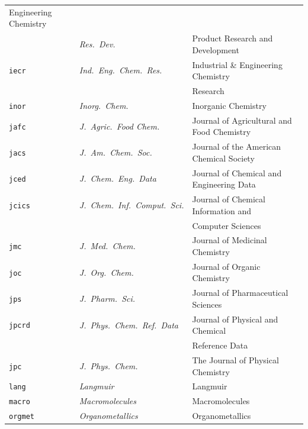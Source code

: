\documentclass{article}
\begin{document}
\begin{tabular}{|lll|}
Engineering Chemistry \\ 
& \hfill\textit{Res.\ Dev.} & \hfill Product Research and Development \\ 
\texttt{iecr} & \textit{Ind.\ Eng.\ Chem.\ Res.} & Industrial \&{}
Engineering Chemistry \\ 
&  & \hfill Research \\ 
\texttt{inor} & \textit{Inorg.\ Chem.} & Inorganic Chemistry \\ 
\texttt{jafc} & \textit{J.~Agric.\ Food Chem.} & Journal of Agricultural and
Food Chemistry \\ 
\texttt{jacs} & \textit{J.~Am.\ Chem.\ Soc.} & Journal of the American
Chemical Society \\ 
\texttt{jced} & \textit{J.~Chem.\ Eng.\ Data} & Journal of Chemical and
Engineering Data \\ 
\texttt{jcics} & \textit{J.~Chem.\ Inf.\ Comput.\ Sci.} & Journal of
Chemical Information and \\ 
&  & \hfill Computer Sciences \\ 
\texttt{jmc} & \textit{J.~Med.\ Chem.} & Journal of Medicinal Chemistry \\ 
\texttt{joc} & \textit{J.~Org.\ Chem.} & Journal of Organic Chemistry \\ 
\texttt{jps} & \textit{J.~Pharm.\ Sci.} & Journal of Pharmaceutical Sciences
\\ 
\texttt{jpcrd} & \textit{J.~Phys.\ Chem.\ Ref.\ Data} & Journal of Physical
and Chemical \\ 
&  & \hfill Reference Data \\ 
\texttt{jpc} & \textit{J.~Phys.\ Chem.} & The Journal of Physical Chemistry
\\ 
\texttt{lang} & \textit{Langmuir} & Langmuir \\ 
\texttt{macro} & \textit{Macromolecules} & Macromolecules \\ 
\texttt{orgmet} & \textit{Organometallics} & Organometallics \\ \hline
\end{tabular}
\end{document}
